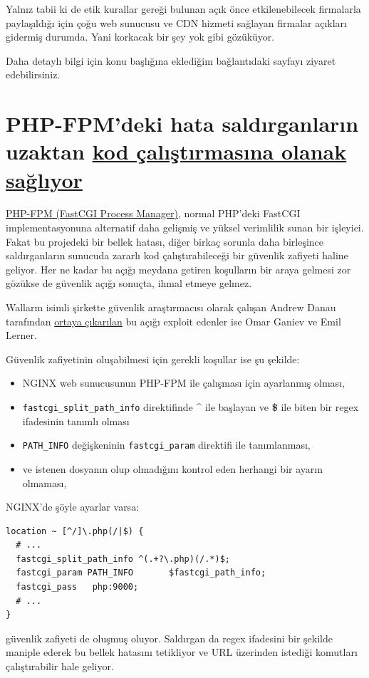\documentclass[11pt]{article}
\begin{document}
Yalnız tabii ki de etik kurallar gereği bulunan açık önce etkilenebilecek
firmalarla paylaşıldığı için çoğu web sunucusu ve CDN hizmeti sağlayan firmalar
açıkları gidermiş durumda. Yani korkacak bir şey yok gibi gözüküyor.

Daha detaylı bilgi için konu başlığına eklediğim bağlantıdaki sayfayı ziyaret
edebilirsiniz.
\section{PHP-FPM'deki hata saldırganların uzaktan \href{https://thehackernews.com/2019/10/nginx-php-fpm-hacking.html}{kod çalıştırmasına olanak sağlıyor}}
\label{sec:orgebb3404}
\href{https://php-fpm.org/}{PHP-FPM (FastCGI Process Manager)}, normal PHP'deki FastCGI implementasyonuna
alternatif daha gelişmiş ve yüksel verimlilik sunan bir işleyici. Fakat bu
projedeki bir bellek hatası, diğer birkaç sorunla daha birleşince
saldırganların sunucuda zararlı kod çalıştırabileceği bir güvenlik zafiyeti
haline geliyor. Her ne kadar bu açığı meydana getiren koşulların bir araya
gelmesi zor gözükse de güvenlik açığı sonuçta, ihmal etmeye gelmez.

Wallarm isimli şirkette güvenlik araştırmacısı olarak çalışan Andrew Danau
tarafından \href{https://lab.wallarm.com/php-remote-code-execution-0-day-discovered-in-real-world-ctf-exercise/}{ortaya çıkarılan} bu açığı exploit edenler ise Omar Ganiev ve Emil
Lerner.

Güvenlik zafiyetinin oluşabilmesi için gerekli koşullar ise şu şekilde:
\begin{itemize}
\item NGINX web sunucusunun PHP-FPM ile çalışması için ayarlanmış olması,
\item \texttt{fastcgi\_split\_path\_info} direktifinde \textbf{\^{}} ile başlayan ve \textbf{\$} ile biten
bir regex ifadesinin tanımlı olması
\item \texttt{PATH\_INFO} değişkeninin \texttt{fastcgi\_param} direktifi ile tanımlanması,
\item ve istenen dosyanın olup olmadığını kontrol eden herhangi bir ayarın
olmaması,
\end{itemize}
NGINX'de şöyle ayarlar varsa:
\begin{verbatim}
location ~ [^/]\.php(/|$) {
  # ...
  fastcgi_split_path_info ^(.+?\.php)(/.*)$;
  fastcgi_param PATH_INFO       $fastcgi_path_info;
  fastcgi_pass   php:9000;
  # ...
}
\end{verbatim}
güvenlik zafiyeti de oluşmuş oluyor. Saldırgan da regex ifadesini bir şekilde
maniple ederek bu bellek hatasını tetikliyor ve URL üzerinden istediği
komutları çalıştırabilir hale geliyor.
\end{document}
